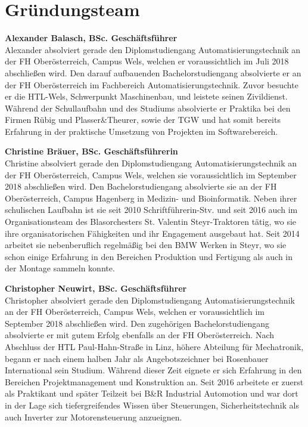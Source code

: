 \section{Gründungsteam}
\textbf{Alexander Balasch, BSc. Geschäftsführer} \\
Alexander absolviert gerade den Diplomstudiengang Automatisierungstechnik an der FH Oberösterreich, Campus Wels, welchen er voraussichtlich im Juli 2018 abschließen wird. Den darauf aufbauenden Bachelorstudiengang absolvierte er an der FH Oberösterreich im Fachbereich Automatisierungstechnik. Zuvor besuchte er die HTL-Wels, Schwerpunkt Maschinenbau, und leistete seinen Zivildienst. Während der Schullaufbahn und des Studiums absolvierte er Praktika bei den Firmen Rübig und Plasser\&Theurer, sowie der TGW und hat somit bereits Erfahrung in der praktische Umsetzung von Projekten im Softwarebereich. 

\textbf{Christine Bräuer, BSc. Geschäftsführerin} \\
Christine absolviert gerade den Diplomstudiengang Automatisierungstechnik an der FH Oberösterreich, Campus Wels, welchen sie voraussichtlich im September 2018 abschließen wird. Den Bachelorstudiengang absolvierte sie an der FH Oberösterreich, Campus Hagenberg in Medizin- und Bioinformatik. 
Neben ihrer schulischen Laufbahn ist sie seit 2010 Schriftführerin-Stv. und seit 2016 auch im Organisationsteam des Blasorchesters St. Valentin Steyr-Traktoren tätig, wo sie ihre organisatorischen Fähigkeiten und ihr Engagement ausgebaut hat. Seit 2014 arbeitet sie nebenberuflich regelmäßig bei den BMW Werken in Steyr, wo sie schon einige Erfahrung in den Bereichen Produktion und Fertigung als auch in der Montage sammeln konnte. \\

\newpage

\textbf{Christopher Neuwirt, BSc. Geschäftsführer} \\
Christopher absolviert gerade den Diplomstudiengang Automatisierungstechnik an der FH Oberösterreich, Campus Wels, welchen er voraussichtlich im September 2018 abschließen wird. Den zugehörigen Bachelorstudiengang absolvierte er mit gutem Erfolg ebenfalls an der FH Oberösterreich. Nach Abschluss der HTL Paul-Hahn-Straße in Linz, höhere Abteilung für Mechatronik, begann er nach einem halben Jahr als Angebotszeichner bei Rosenbauer International sein Studium. Während dieser Zeit eignete er sich Erfahrung in den Bereichen Projektmanagement und Konstruktion an. Seit 2016 arbeitete er zuerst als Praktikant und später Teilzeit bei B\&R Industrial Automotion und war dort in der Lage sich tiefergreifendes Wissen über Steuerungen, Sicherheitstechnik als auch Inverter zur Motorensteuerung anzueignen.\\

